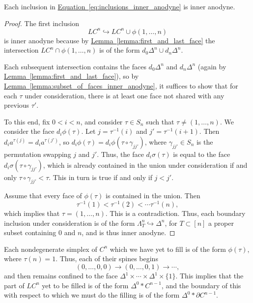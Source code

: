 \documentclass[main.tex]{subfiles}
\begin{document}
\begin{proposition}
  \label{prop:inner_anodyne_cube_filling}
  Each inclusion in \hyperref[eq:inclusions_inner_anodyne]{Equation~\ref*{eq:inclusions_inner_anodyne}} is inner anodyne.
\end{proposition}
\begin{proof}
  The first inclusion
  \begin{equation*}
    LC^{n} \hookrightarrow LC^{n} \cup \phi(1, \ldots, n)
  \end{equation*}
  is inner anodyne because by \hyperref[lemma:first_and_last_face]{Lemma~\ref*{lemma:first_and_last_face}} the intersection $LC^{n} \cap \phi(1, \ldots, n)$ is of the form $d_{0}\Delta^{n} \cup d_{n} \Delta^{n}$.

  Each subsequent intersection contains the faces $d_{0}\Delta^{n}$ and $d_{n}\Delta^{n}$ (again by \hyperref[lemma:first_and_last_face]{Lemma~\ref*{lemma:first_and_last_face}}), so by \hyperref[lemma:subset_of_faces_inner_anodyne]{Lemma~\ref*{lemma:subset_of_faces_inner_anodyne}}, it suffices to show that for each $\tau$ under consideration, there is at least one face not shared with any previous $\tau'$.

  To this end, fix $0 < i < n$, and consider $\tau \in S_{n}$ such that $\tau \neq (1, \ldots, n)$. We consider the face $d_{i}\phi(\tau)$. Let $j = \tau^{-1}(i)$ and $j' = \tau^{-1}(i+1)$. Then $d_{i} a^{\tau(j)} = d_{i}a^{\tau(j')}$, so $d_{i} \phi(\tau) = d_{i}\phi(\tau \circ \gamma_{jj'})$, where $\gamma_{jj'} \in S_{n}$ is the permutation swapping $j$ and $j'$. Thus, the face $d_{i}\sigma(\tau)$ is equal to the face $d_{i}\sigma(\tau \circ \gamma_{jj'})$, which is already contained in the union under consideration if and only $\tau \circ \gamma_{jj'} < \tau$. This in turn is true if and only if $j < j'$.

  Assume that every face of $\phi(\tau)$ is contained in the union. Then
  \begin{equation*}
    \tau^{-1}(1) < \tau^{-1}(2) < \cdots \tau^{-1}(n),
  \end{equation*}
  which implies that $\tau = (1, \ldots, n)$. This is a contradiction. Thus, each boundary inclusion under consideration is of the form $\Lambda^{n}_{T} \hookrightarrow \Delta^{n}$, for $T \subset [n]$ a proper subset containing 0 and $n$, and is thus inner anodyne.
\end{proof}

Each nondegenerate simplex of $C^{n}$ which we have yet to fill is of the form $\phi(\tau)$, where $\tau(n) = 1$. Thus, each of their spines begins
\begin{equation*}
  (0, \ldots, 0, 0) \to (0, \ldots, 0, 1) \to \cdots,
\end{equation*}
and then remains confined to the face $\Delta^{1} \times \cdots \times \Delta^{1} \times \{1\}$. This implies that the part of $LC^{n}$ yet to be filled is of the form $\Delta^{0} \ast C^{n-1}$, and the boundary of this with respect to which we must do the filling is of the form $\Delta^{0} \ast \partial C^{n-1}$.
\end{document}
